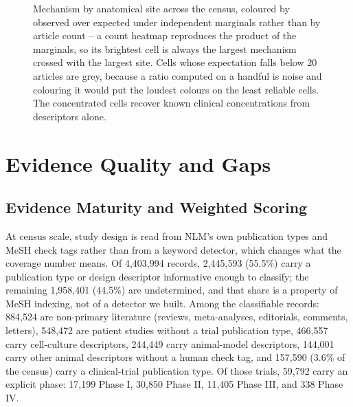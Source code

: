 \documentclass[11pt,twoside,openright]{report}
\begin{document}
\begin{figure}[tbp]
\setcounter{figure}{4}
\caption{Mechanism by anatomical site across the census, coloured by observed over expected under independent marginals rather than by article count -- a count heatmap reproduces the product of the marginals, so its brightest cell is always the largest mechanism crossed with the largest site. Cells whose expectation falls below 20 articles are grey, because a ratio computed on a handful is noise and colouring it would put the loudest colours on the least reliable cells. The concentrated cells recover known clinical concentrations from descriptors alone.}
\label{fig:fig5c_mechanism_site_matrix}
\end{figure}

\chapter{Evidence Quality and Gaps}


\section{Evidence Maturity and Weighted Scoring}

At census scale, study design is read from NLM's own publication types and MeSH check tags rather than from a keyword detector, which changes what the coverage number means. Of 4,403,994 records, 2,445,593 (55.5\%) carry a publication type or design descriptor informative enough to classify; the remaining 1,958,401 (44.5\%) are undetermined, and that share is a property of MeSH indexing, not of a detector we built. Among the classifiable records: 884,524 are non-primary literature (reviews, meta-analyses, editorials, comments, letters), 548,472 are patient studies without a trial publication type, 466,557 carry cell-culture descriptors, 244,449 carry animal-model descriptors, 144,001 carry other animal descriptors without a human check tag, and 157,590 (3.6\% of the census) carry a clinical-trial publication type. Of those trials, 59,792 carry an explicit phase: 17,199 Phase I, 30,850 Phase II, 11,405 Phase III, and 338 Phase IV.
\end{document}
